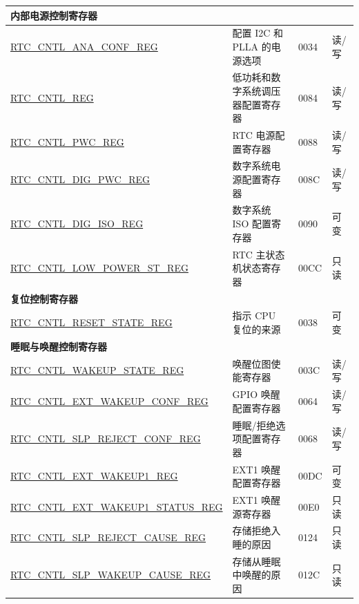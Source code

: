 \begin{longtable}{ | p{6.5cm} | p{6.8cm} | p{1.3cm} | p{1cm} | }
\multicolumn{4}{|l|}{\textbf{内部电源控制寄存器}} \\ \hline
\hyperref[regdesc:RTCCNTLANACONFREG]{RTC\_CNTL\_ANA\_CONF\_REG} & 配置 I2C 和 PLLA 的电源选项 & \hexprefix{}0034 & 读/写 \\ \hline
\hyperref[regdesc:RTCCNTLREG]{RTC\_CNTL\_REG} & 低功耗和数字系统调压器配置寄存器 & \hexprefix{}0084 & 读/写 \\ \hline
\hyperref[regdesc:RTCCNTLPWCREG]{RTC\_CNTL\_PWC\_REG} & RTC 电源配置寄存器 & \hexprefix{}0088 & 读/写 \\ \hline
\hyperref[regdesc:RTCCNTLDIGPWCREG]{RTC\_CNTL\_DIG\_PWC\_REG} & 数字系统电源配置寄存器 & \hexprefix{}008C & 读/写 \\ \hline
\hyperref[regdesc:RTCCNTLDIGISOREG]{RTC\_CNTL\_DIG\_ISO\_REG} & 数字系统 ISO 配置寄存器 & \hexprefix{}0090 & 可变 \\ \hline
\hyperref[regdesc:RTCCNTLLOWPOWERSTREG]{RTC\_CNTL\_LOW\_POWER\_ST\_REG} & RTC 主状态机状态寄存器 & \hexprefix{}00CC & 只读 \\ \hline
\multicolumn{4}{|l|}{\textbf{复位控制寄存器}} \\ \hline
\hyperref[regdesc:RTCCNTLRESETSTATEREG]{RTC\_CNTL\_RESET\_STATE\_REG} & 指示 CPU 复位的来源 & \hexprefix{}0038 & 可变 \\ \hline
\multicolumn{4}{|l|}{\textbf{睡眠与唤醒控制寄存器}} \\ \hline
\hyperref[regdesc:RTCCNTLWAKEUPSTATEREG]{RTC\_CNTL\_WAKEUP\_STATE\_REG} & 唤醒位图使能寄存器 & \hexprefix{}003C & 读/写 \\ \hline
\hyperref[regdesc:RTCCNTLEXTWAKEUPCONFREG]{RTC\_CNTL\_EXT\_WAKEUP\_CONF\_REG} & GPIO 唤醒配置寄存器 & \hexprefix{}0064 & 读/写 \\ \hline
\hyperref[regdesc:RTCCNTLSLPREJECTCONFREG]{RTC\_CNTL\_SLP\_REJECT\_CONF\_REG} & 睡眠/拒绝选项配置寄存器 & \hexprefix{}0068 & 读/写 \\ \hline
\hyperref[regdesc:RTCCNTLEXTWAKEUP1REG]{RTC\_CNTL\_EXT\_WAKEUP1\_REG} & EXT1 唤醒配置寄存器 & \hexprefix{}00DC & 可变 \\ \hline
\hyperref[regdesc:RTCCNTLEXTWAKEUP1STATUSREG]{RTC\_CNTL\_EXT\_WAKEUP1\_STATUS\_REG} & EXT1 唤醒源寄存器 & \hexprefix{}00E0 & 只读 \\ \hline
\hyperref[regdesc:RTCCNTLSLPREJECTCAUSEREG]{RTC\_CNTL\_SLP\_REJECT\_CAUSE\_REG} & 存储拒绝入睡的原因  & \hexprefix{}0124 & 只读 \\ \hline
\hyperref[regdesc:RTCCNTLSLPWAKEUPCAUSEREG]{RTC\_CNTL\_SLP\_WAKEUP\_CAUSE\_REG} & 存储从睡眠中唤醒的原因 & \hexprefix{}012C & 只读 \\ \hline

\end{longtable}

